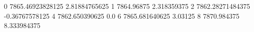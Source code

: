 0 7865.46923828125 2.81884765625
1 7864.96875 2.318359375
2 7862.28271484375 -0.36767578125
4 7862.650390625 0.0
6 7865.681640625 3.03125
8 7870.984375 8.333984375
